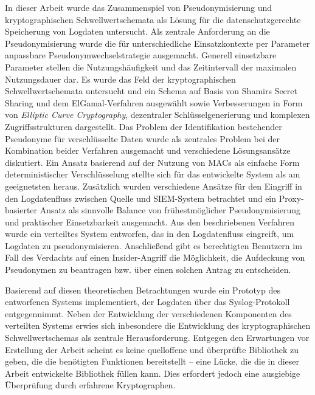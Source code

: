 In dieser Arbeit wurde das Zusammenspiel von Pseudonymisierung und kryptographischen Schwellwertschemata als Lösung für die datenschutzgerechte Speicherung von Logdaten untersucht. 
Als zentrale Anforderung an die Pseudonymisierung wurde die für unterschiedliche Einsatzkontexte per Parameter anpassbare Pseudonymwechselstrategie ausgemacht. Generell einsetzbare Parameter stellen die Nutzungshäufigkeit und das Zeitintervall der maximalen Nutzungsdauer dar. 
Es wurde das Feld der kryptographischen Schwellwertschemata untersucht und ein Schema auf Basis von Shamirs Secret Sharing und dem ElGamal-Verfahren ausgewählt sowie Verbesserungen in Form von \textit{Elliptic Curve Cryptography}, dezentraler Schlüsselgenerierung und komplexen Zugriffsstrukturen dargestellt.
Das Problem der Identifikation bestehender Pseudonyme für verschlüsselte Daten wurde als zentrales Problem bei der Kombination beider Verfahren ausgemacht und verschiedene Lösungsansätze diskutiert. Ein Ansatz basierend auf der Nutzung von MACs als einfache Form deterministischer Verschlüsselung stellte sich für das entwickelte System als am geeignetsten heraus.
Zusätzlich wurden verschiedene Ansätze für den Eingriff in den Logdatenfluss zwischen Quelle und SIEM-System betrachtet und ein Proxy-basierter Ansatz als sinnvolle Balance von frühestmöglicher Pseudonymisierung und praktischer Einsetzbarkeit ausgemacht.
Aus den beschriebenen Verfahren wurde ein verteiltes System entworfen, das in den Logdatenfluss eingreift, um Logdaten zu pseudonymisieren. Anschließend gibt es berechtigten Benutzern im Fall des Verdachts auf einen Insider-Angriff die Möglichkeit, die Aufdeckung von Pseudonymen zu beantragen bzw. über einen solchen Antrag zu entscheiden.

Basierend auf diesen theoretischen Betrachtungen wurde ein Prototyp des entworfenen Systems implementiert, der Logdaten über das Syslog-Protokoll entgegennimmt. Neben der Entwicklung der verschiedenen Komponenten des verteilten Systems erwies sich inbesondere die Entwicklung des kryptographischen Schwellwertschemas als zentrale Herausforderung. Entgegen den Erwartungen vor Erstellung der Arbeit scheint es keine quelloffene und überprüfte Bibliothek zu geben, die die benötigten Funktionen bereitstellt -- eine Lücke, die die in dieser Arbeit entwickelte Bibliothek füllen kann. Dies erfordert jedoch eine ausgiebige Überprüfung durch erfahrene Kryptographen.

